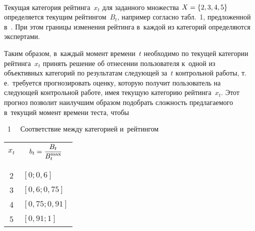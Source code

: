 \begin{multicols}{2}
\begin{figure*} %
\vspace*{1pt}
 \begin{center}
 \mbox{%
 \epsfxsize=117.816mm 
 }
 \end{center}
   \vspace*{-9pt}
\end{figure*}

      Текущая категория рейтинга~$x_t$ для заданного множества $X\hm= \{2,3,4,5\}$ 
определяется текущим рейтингом~$B_t$, например согласно табл.~1, предложенной 
в~\cite{15-bos}. При этом границы изменения рейтинга в~каждой из категорий 
определяются экспертами.
      
      

      Таким образом, в~каждый момент времени~$t$ необходимо по текущей категории 
рейтинга~$x_t$ принять решение об отнесении пользователя к~одной из объективных 
категорий по результатам сле\-ду\-ющей\linebreak
 за~$t$ контрольной работы, т.\,е.\ требуется 
прогнозировать оценку, которую получит пользователь на следующей контрольной 
работе, имея текущую категорию рейтинга~$x_t$. Этот прогноз позволит \mbox{наилучшим} 
образом подобрать сложность предлагаемого в~текущий момент времени
теста, чтобы\linebreak\vspace*{-12pt}

{   %
 \begin{center}
 \vspace*{1pt}
 
\noindent
\parbox{40mm}{{{\tablename~1}\ \ \small{
Соответствие между категорией и~рейтингом
}}}

\vspace*{6pt}




{\small    
      
      \tabcolsep=15pt
      \begin{tabular}{|c|l|}
      \hline
$x_t$&\multicolumn{1}{|c|}{$\displaystyle b_t=\displaystyle\frac{\displaystyle B_t\mathstrut}{\displaystyle B_t^{\max}\mathstrut}$}\\
&\\[-10pt]
\hline
&\\[-10pt]
2&$[0; 0{,}6]$\\
3&$[0{,}6; 0{,}75]$\\
4&$[0{,}75; 0{,}91]$\\
5&$[0{,}91; 1]$\\
\hline
\end{tabular}
}
\end{center}
}


\end{multicols}

